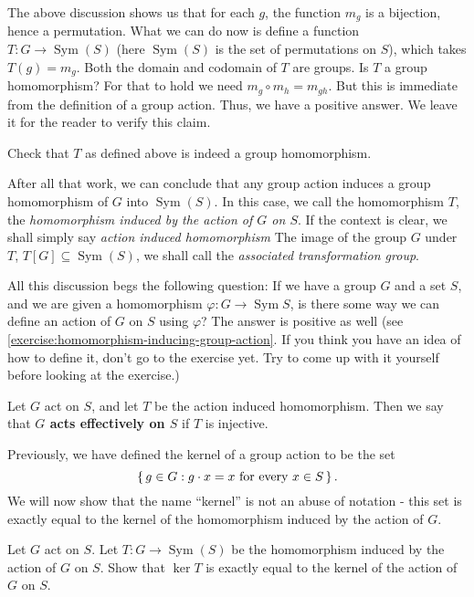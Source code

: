\documentclass[./main.tex]{subfiles}
\begin{document}
The above discussion shows us that for each $g$, the function $m_g$ is a
bijection, hence a permutation. What we can do now is define a function $T: G
\to \operatorname{Sym}(S)$ (here $\operatorname{Sym}(S)$ is the set of
permutations on $S$), which takes $T(g) = m_g$. Both the domain and codomain of
$T$ are groups. Is $T$ a group homomorphism? For that to hold we need $m_g \circ
m_h = m_{gh}$. But this is immediate from the definition of a group action.
Thus, we have a positive answer. We leave it for the reader to verify this
claim.
\begin{exercise}
    Check that $T$ as defined above is indeed a group homomorphism.
\end{exercise}
After all that work, we can conclude that any group action induces a group
homomorphism of $G$ into $\operatorname{Sym}(S)$. In this case, we call the
homomorphism $T$, the \emph{homomorphism induced by the action of $G$ on $S$}.
If the context is clear, we shall simply say \emph{action induced homomorphism} The
image of the group $G$ under $T$, $T[G] \subseteq \operatorname{Sym}(S)$, we
shall call the \emph{associated transformation group}. 

All this discussion begs the following question: If we have a group $G$ and a
set $S$, and we are given a homomorphism $\varphi: G \to \operatorname{Sym} S$,
is there some way we can define an action of $G$ on $S$ using $\varphi$? The
answer is positive as well (see
\cref{exercise:homomorphism-inducing-group-action}. If you think you have an
idea of how to define it, don't go to the exercise yet. Try to come up with it
yourself before looking at the exercise.)

\begin{definition}
\label{def:acting-effectively}
    Let $G$ act on $S$, and let $T$ be the action induced homomorphism. Then we
    say that \textbf{$G$ acts effectively on $S$} if $T$ is injective.
\end{definition}


Previously, we have defined the kernel of a group action to be the set 
\[ 
    \set{g \in G: g \cdot x = x \text{ for every $x$} \in S}.
\] 
We will now show that the name ``kernel'' is not an abuse of notation - this set
is exactly equal to the kernel of the homomorphism induced by the action of $G$. 
\begin{exercise}
    Let $G$ act on $S$. Let $T: G \to \operatorname{Sym}(S)$ be the homomorphism
    induced by the action of $G$ on $S$. Show that $\ker T$ is exactly equal to
    the kernel of the action of $G$ on $S$.
\end{exercise}
\end{document}
